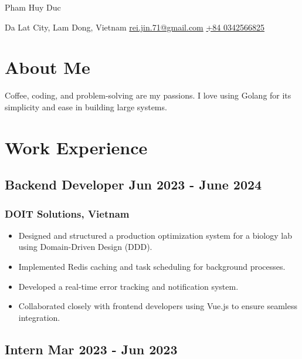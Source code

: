 \documentclass[11pt]{article}
\begin{document}
\begin{center}      
    {\fontsize{28}{28}\selectfont Pham Huy Duc} \\ \bigskip

    {\color{icnclr}\faMapMarker} Da Lat City, Lam Dong, Vietnam \quad 
    {\color{icnclr}\faEnvelope[regular]} \href{mailto:rei.jin.71@gmail.com}{rei.jin.71@gmail.com} \quad
    {\color{icnclr}} \href{tel:+840342566825}{+84 0342566825}
\end{center}

\section{About Me}
Coffee, coding, and problem-solving are my passions. I love using Golang for its simplicity and ease in building large systems.

\section{Work Experience}

\subsection{Backend Developer \hfill \normalfont Jun 2023 - June 2024}
\subsubsection{DOIT Solutions, Vietnam}
\begin{itemize}
    \item[\checkmark] Designed and structured a production optimization system for a biology lab using Domain-Driven Design (DDD).
    \item[\checkmark] Implemented Redis caching and task scheduling for background processes.
    \item[\checkmark] Developed a real-time error tracking and notification system.
    \item[\checkmark] Collaborated closely with frontend developers using Vue.js to ensure seamless integration.
\end{itemize}

\subsection{Intern \hfill \normalfont Mar 2023 - Jun 2023}
\end{document}
